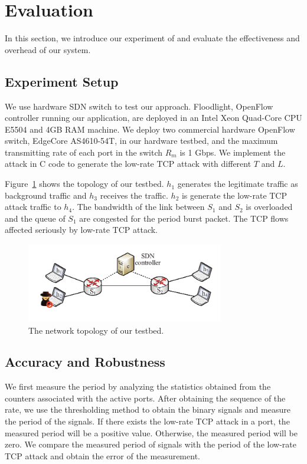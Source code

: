 \section{Evaluation}

In this section, we introduce our experiment of \TheName{} and evaluate the effectiveness and overhead of our system. 

\subsection{Experiment Setup}
We use hardware SDN switch to test our approach. Floodlight, OpenFlow controller running our application, are deployed in an Intel Xeon Quad-Core CPU E5504 and 4GB RAM machine. We deploy two commercial hardware OpenFlow switch, EdgeCore AS4610-54T, in our hardware testbed, and the maximum transmitting rate of each port in the switch $R_m$ is 1 Gbps. We implement the attack in C code to generate the low-rate TCP attack with different $T$ and $L$. 

Figure~\ref{fig:topology} shows the topology of our testbed. $h_1$ generates the legitimate traffic as background traffic and $h_3$ receives the traffic. $h_2$ is generate the low-rate TCP attack traffic to $h_4$. The bandwidth of the link between $S_1$ and $S_2$ is overloaded and the queue of $S_1$ are congested for the period burst packet. The TCP flows affected seriously by low-rate TCP attack.

\begin{figure}
\vspace{-0.1in}
\centering
\includegraphics[width=3.4in]{Evaluation/topology.pdf}
\vspace{-0.1in}
\caption{\small{The network topology of our testbed.}}
\label{fig:topology}
\vspace{-0.2in}
\end{figure}

\subsection{Accuracy and Robustness}

We first measure the period by analyzing the statistics obtained from the counters associated with the active ports. After obtaining the sequence of the rate, we use the thresholding method to obtain the binary signals and measure the period of the signals. If there exists the low-rate TCP attack in a port, the measured period will be a positive value. Otherwise, the measured period will be zero. We compare the measured period of signals with the period of the low-rate TCP attack and obtain the error of the measurement.

